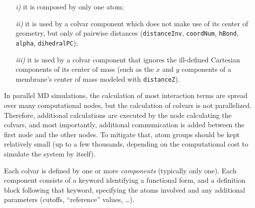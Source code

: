 \begin{enumerate}
  \item[\emph{i)}] it is composed by only one atom;
  \item[\emph{ii)}] it is used by a colvar component which does not make use of its center of geometry, but only of pairwise distances (\texttt{distanceInv}, \texttt{coordNum}, \texttt{hBond}, \texttt{alpha}, \texttt{dihedralPC});
  \item[\emph{iii)}]  it is used by a colvar component that ignores the ill-defined Cartesian components of its center of mass (such as the $x$ and $y$ components of a membrane's center of mass modeled with \texttt{distanceZ}).
\end{enumerate}

\label{sec:colvar_atom_groups_scaling}

In parallel MD simulations, the calculation of most interaction terms are spread over many computational nodes, but the calculation of colvars is not parallelized.
Therefore, additional calculations are executed by the node calculating the colvars, and most importantly, additional communication is added between the first node and the other nodes.
To mitigate that, atom groups should be kept relatively small (up to a few thousands, depending on the computational cost to simulate the system by itself).  

\label{sec:cvc}

Each colvar is defined by one or more \emph{components} (typically
only one).  Each component consists of a keyword identifying a
functional form, and a definition block following that keyword,
specifying the atoms involved and any additional parameters (cutoffs,
``reference'' values, \ldots).

